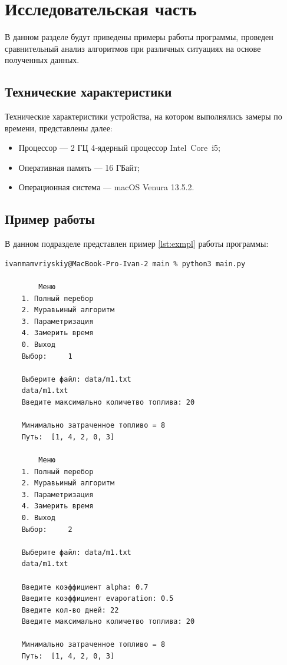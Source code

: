 \chapter{Исследовательская часть}

В данном разделе будут приведены примеры работы программы, проведен сравнительный анализ алгоритмов 
при различных ситуациях на основе полученных данных.

\section{Технические характеристики}

Технические характеристики устройства, на котором выполнялись замеры по времени, представлены далее:

\begin{itemize}
	\item Процессор --- 2 ГЦ 4‑ядерный процессор Intel Core i5;
	\item Оперативная память --- 16 ГБайт;
	\item Операционная система --- macOS Venura 13.5.2. 
\end{itemize}

\section{Пример работы}

В данном подразделе представлен пример \ref{lst:exmpl} работы программы: 

\begin{lstlisting}[label=lst:exmpl,caption=Демонстрация работы алгоритма]
    ivanmamvriyskiy@MacBook-Pro-Ivan-2 main % python3 main.py

        Меню 
    1. Полный перебор 
    2. Муравьиный алгоритм 
    3. Параметризация 
    4. Замерить время 
    0. Выход 
    Выбор:     1

    Выберите файл: data/m1.txt
    data/m1.txt
    Введите максимально количетво топлива: 20

    Минимально затраченное топливо = 8 
    Путь:  [1, 4, 2, 0, 3]

        Меню 
    1. Полный перебор 
    2. Муравьиный алгоритм 
    3. Параметризация 
    4. Замерить время 
    0. Выход 
    Выбор:     2

    Выберите файл: data/m1.txt
    data/m1.txt

    Введите коэффициент alpha: 0.7
    Введите коэффициент evaporation: 0.5
    Введите кол-во дней: 22
    Введите максимально количетво топлива: 20

    Минимально затраченное топливо = 8 
    Путь:  [1, 4, 2, 0, 3]
\end{lstlisting}

